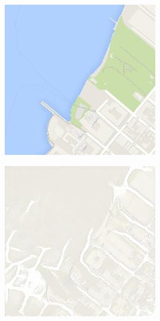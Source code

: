\begin{figure}[ht]
  \medskip

  \begin{subfigure}[t]{.14\textwidth}
    \centering
    \includegraphics[width=\linewidth]{images/cycleGanResults/Maps8_Or_Ld120_E100_Lr0002.jpg}
  \end{subfigure}
  \begin{subfigure}[t]{.14\textwidth}
    \centering
    \includegraphics[width=\linewidth]{images/cycleGanResults/Maps8_Ld120_E100_E0002.jpg}

\end{subfigure}
\end{figure}
